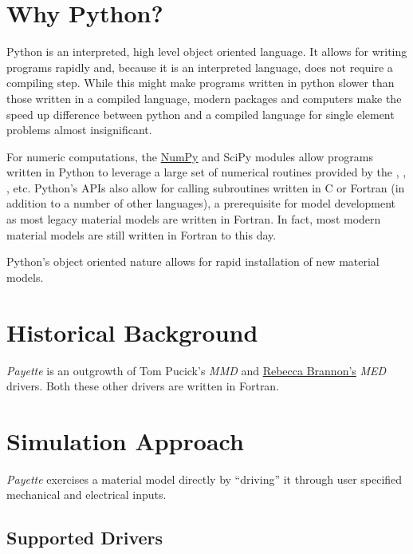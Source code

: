 \documentclass[letterpaper,10pt,english]{sphinxmanual}
\begin{document}
\section{Why Python?}
\label{Files/introduction:why-python}
Python is an interpreted, high level object oriented language. It allows for
writing programs rapidly and, because it is an interpreted language, does not
require a compiling step. While this might make programs written in python slower
than those written in a compiled language, modern packages and computers make the
speed up difference between python and a compiled language for single element
problems almost insignificant.

For numeric computations, the \href{http://www.numpy.org}{NumPy} and SciPy modules allow programs written in Python to leverage a large
set of numerical routines provided by the , , ,
etc. Python's APIs also allow for calling subroutines written in C or Fortran (in
addition to a number of other languages), a prerequisite for model development as
most legacy material models are written in Fortran. In fact, most modern material
models are still written in Fortran to this day.

Python's object oriented nature allows for rapid installation of new material
models.


\section{Historical Background}
\label{Files/introduction:historical-background}
\emph{Payette} is an outgrowth of Tom Pucick's \emph{MMD} and \href{http://www.mech.utah.edu/~brannon/}{Rebecca Brannon's} \emph{MED} drivers. Both these other drivers
are written in Fortran.


\section{Simulation Approach}
\label{Files/introduction:simulation-approach}
\emph{Payette} exercises a material model directly by ``driving'' it through user
specified mechanical and electrical inputs.


\subsection{Supported Drivers}
\label{Files/introduction:supported-drivers}
\end{document}
